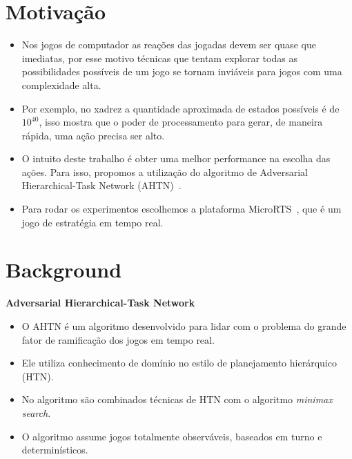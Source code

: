 \documentclass[a0,portrait]{a0poster}
\begin{document}

\begin{multicols}{2} 
\color{NavyBlue}
\color{Black}
\raggedright
\Large

\newcommand\itemadjust{\itemsep.5em \parskip0pt \parsep0pt}
\color{NavyBlue}
\section*{\huge Motiva\c{c}\~ao}
\color{Black}

\begin{itemize}
	[leftmargin=2em]\itemadjust
	\item Nos jogos de computador as rea\c{c}\~oes das jogadas devem ser quase que imediatas, por esse motivo t\'ecnicas que tentam explorar todas as possibilidades poss\'iveis de um jogo se tornam invi\'aveis para jogos com uma complexidade alta.
	\item Por exemplo, no xadrez a quantidade aproximada de estados poss\'iveis \'e de $10^{40}$, isso mostra que o poder de processamento para gerar, de maneira r\'apida, uma a\c{c}\~ao precisa ser alto. 
	\item O intuito deste trabalho é obter uma melhor performance na escolha das ações. Para isso, propomos a utilização do algoritmo de Adversarial Hierarchical-Task Network (AHTN)~\cite{ontanon2015adversarial}.
	\item Para rodar os experimentos escolhemos a plataforma MicroRTS~\cite{ontanon2013combinatorial}, que \'e um jogo de estrat\'egia em tempo real. 
\end{itemize}
\color{NavyBlue}
\section*{\huge Background}
\color{Black}

\textbf{Adversarial Hierarchical-Task Network}

\begin{itemize}
	[leftmargin=2em]\itemadjust
	\item O AHTN \'e um algoritmo desenvolvido para lidar com o problema do grande fator de ramifica\c{c}\~ao dos jogos em tempo real.
	\item Ele utiliza conhecimento de dom\'inio no estilo de planejamento hier\'arquico (HTN).
	\item No algoritmo s\~ao combinados t\'ecnicas de HTN com o algoritmo \textit{minimax search}.
	\item O algoritmo assume jogos totalmente observ\'aveis, baseados em turno e determin\'isticos. 
\end{itemize}


\end{multicols}
\end{document}

